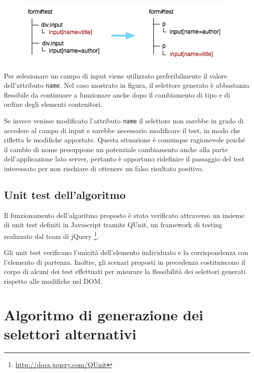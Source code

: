 \begin{figure}[htbp]
\begin{center}
\includegraphics{images/dom_examples/form1.png}
\end{center}
\end{figure}

Per selezionare un campo di input viene utilizzato preferibilmente il valore dell'attributo \verb|name|. Nel caso mostrato in figura, il selettore generato è abbastanza flessibile da continuare a funzionare anche dopo il cambiamento di tipo e di ordine degli elementi contenitori.

Se invece venisse modificato l'attributo \verb|name| il selettore non sarebbe in grado di accedere al campo di input e sarebbe necessario modificare il test, in modo che rifletta le modifiche apportate. Questa situazione è comunque ragionevole poiché il cambio di nome presuppone un potenziale cambiamento anche alla parte dell'applicazione lato server, pertanto è opportuno ridefinire il passaggio del test interessato per non rischiare di ottenere un falso risultato positivo.

\subsection {Unit test dell'algoritmo}

Il funzionamento dell'algoritmo proposto è stato verificato attraverso un insieme di unit test definiti in Javascript tramite QUnit, un framework di testing realizzato dal team di jQuery \footnote{\url{http://docs.jquery.com/QUnit}}. 

Gli unit test verificano l'unicità dell'elemento individuato e la corrispondenza con l'elemento di partenza. Inoltre, gli scenari proposti in precedenza costituiscono il corpo di alcuni dei test effettuati per misurare la flessibilità dei selettori generati rispetto alle modifiche nel DOM.

\section{Algoritmo di generazione dei selettori alternativi}

